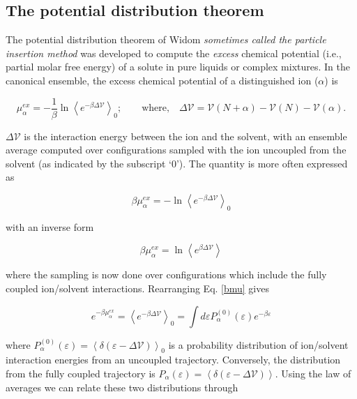 \begin{theory}
 \subsection{\label{ch2:sec4:level3}The potential distribution theorem}
 The potential distribution theorem of Widom \emph{sometimes called the particle insertion method} was developed to compute the 
 \emph{excess} chemical potential (i.e., partial molar free energy) of a solute in pure liquids or complex mixtures. In the 
 canonical ensemble, the excess chemical potential of a distinguished ion ($\alpha$) is
 
 \begin{equation}\label{mu}
     \mu^{ex}_{\alpha} = -\frac{1}{\beta}\ln\left<e^{-\beta\Delta\mathcal{V}}\right>_{0}; \quad\quad \textrm{where,} \quad \Delta\mathcal{V} = \mathcal{V}(N+\alpha)-\mathcal{V}(N)-\mathcal{V}(\alpha).
 \end{equation}
 
 \noindent $\Delta\mathcal{V}$ is the interaction energy between the ion and the solvent, with an ensemble average computed over
 configurations sampled with the ion uncoupled from the solvent (as indicated by the subscript `0'). The quantity is more 
 often expressed as
 
 \begin{equation}\label{bmu}
     \beta\mu^{ex}_{\alpha} = -\ln\left<e^{-\beta\Delta\mathcal{V}}\right>_{0}
 \end{equation}

 \noindent with an inverse form

 \begin{equation}\label{invbmu}
     \beta\mu^{ex}_{\alpha} = \ln\left<e^{\beta\Delta\mathcal{V}}\right>
 \end{equation} 
 
 \noindent where the sampling is now done over configurations which include the fully coupled ion/solvent interactions.
 Rearranging Eq. \ref{bmu} gives
 
 \begin{equation}\label{pmu}
     e^{-\beta\mu^{ex}_{\alpha}} = \left<e^{-\beta\Delta\mathcal{V}}\right>_{0} = \int d\varepsilon P_{\alpha}^{(0)}(\varepsilon)e^{-\beta\varepsilon}
 \end{equation}

 \noindent where $P_{\alpha}^{(0)}(\varepsilon) = \left<\delta\left(\varepsilon-\Delta\mathcal{V}\right)\right>_{0}$ is 
 a probability distribution of ion/solvent interaction energies from an uncoupled trajectory. Conversely, the distribution 
 from the fully coupled trajectory is $P_{\alpha}(\varepsilon) = 
 \left<\delta\left(\varepsilon-\Delta\mathcal{V}\right)\right>$. Using the law of averages we can relate these two 
 distributions through
 

\end{theory}
